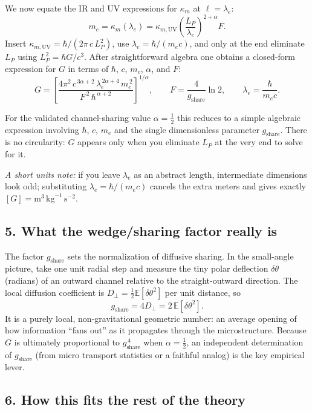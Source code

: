 \documentclass[11pt]{article}
\begin{document}
We now equate the IR and UV expressions for $\kappa_m$ at $\ell=\lambda_e$:
\[
m_e=\kappa_m(\lambda_e)=\kappa_{m,\mathrm{UV}}\left(\frac{L_P}{\lambda_e}\right)^{2+\alpha}F.
\]
Insert $\kappa_{m,\mathrm{UV}}=\hbar/(2\pi\,c\,L_P^2)$, use $\lambda_e=\hbar/(m_e c)$, and only at the end eliminate $L_P$ using $L_P^2=\hbar G/c^3$. After straightforward algebra one obtains a closed-form expression for $G$ in terms of $\hbar$, $c$, $m_e$, $\alpha$, and $F$:
\[
G=\left[\frac{4\pi^{2}\,c^{\,3\alpha+2}\,\lambda_{e}^{\,2\alpha+4}\,m_{e}^{\,2}}
{F^{\,2}\,\hbar^{\,\alpha+2}}\right]^{1/\alpha},
\qquad
F=\frac{4}{g_{\mathrm{share}}}\ln 2,
\qquad
\lambda_{e}=\frac{\hbar}{m_{e}c}.
\]

For the validated channel-sharing value $\alpha=\tfrac12$ this reduces to a simple algebraic expression involving $\hbar$, $c$, $m_e$ and the single dimensionless parameter $g_{\mathrm{share}}$. There is no circularity: $G$ appears only when you eliminate $L_P$ at the very end to solve for it.

\emph{A short units note:} if you leave $\lambda_e$ as an abstract length, intermediate dimensions look odd; substituting $\lambda_e=\hbar/(m_e c)$ cancels the extra meters and gives exactly $[G]=\mathrm{m}^3\,\mathrm{kg}^{-1}\,\mathrm{s}^{-2}$.

\subsection*{5. What the wedge/sharing factor really is}

The factor $g_{\mathrm{share}}$ sets the normalization of diffusive sharing. In the small-angle picture, take one unit radial step and measure the tiny polar deflection $\delta\theta$ (radians) of an outward channel relative to the straight-outward direction. The local diffusion coefficient is $D_\perp=\tfrac12\mathbb{E}[\delta\theta^2]$ per unit distance, so
\[
g_{\mathrm{share}}=4D_\perp=2\,\mathbb{E}[\delta\theta^2].
\]
It is a purely local, non-gravitational geometric number: an average opening of how information “fans out” as it propagates through the microstructure. Because $G$ is ultimately proportional to $g_{\mathrm{share}}^{\,4}$ when $\alpha=\tfrac12$, an independent determination of $g_{\mathrm{share}}$ (from micro transport statistics or a faithful analog) is the key empirical lever.

\subsection*{6. How this fits the rest of the theory}
\end{document}
